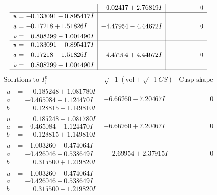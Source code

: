 \documentclass[1p]{elsarticle_modified}
\theoremstyle{definition}
\newcommand{\I}{\sqrt{-1}}
\begin{document}
$$\begin{array}{c|c|c}
 & \phantom{-}0.02417 + 2.76819 I & \phantom{-0.000000 } 0 \\ \hline\begin{aligned}
u &= -0.133091 + 0.895417 I \\
a &= -0.17218 + 1.51826 I \\
b &= \phantom{-}0.808299 - 1.004490 I\end{aligned}
 & -4.47954 - 4.44672 I & \phantom{-0.000000 } 0 \\ \hline\begin{aligned}
u &= -0.133091 - 0.895417 I \\
a &= -0.17218 - 1.51826 I \\
b &= \phantom{-}0.808299 + 1.004490 I\end{aligned}
 & -4.47954 + 4.44672 I & \phantom{-0.000000 } 0\\
 \hline 
 \end{array}$$\newpage$$\begin{array}{c|c|c}  
\text{Solutions to }I^u_{1}& \I (\text{vol} + \sqrt{-1}CS) & \text{Cusp shape}\\
 \hline 
\begin{aligned}
u &= \phantom{-}0.185248 + 1.081780 I \\
a &= -0.465084 + 1.124470 I \\
b &= \phantom{-}0.128815 - 1.149810 I\end{aligned}
 & -6.66260 - 7.20467 I & \phantom{-0.000000 } 0 \\ \hline\begin{aligned}
u &= \phantom{-}0.185248 - 1.081780 I \\
a &= -0.465084 - 1.124470 I \\
b &= \phantom{-}0.128815 + 1.149810 I\end{aligned}
 & -6.66260 + 7.20467 I & \phantom{-0.000000 } 0 \\ \hline\begin{aligned}
u &= -1.003260 + 0.474064 I \\
a &= -0.426046 + 0.538649 I \\
b &= \phantom{-}0.315500 + 1.219820 I\end{aligned}
 & \phantom{-}2.69954 + 2.37915 I & \phantom{-0.000000 } 0 \\ \hline\begin{aligned}
u &= -1.003260 - 0.474064 I \\
a &= -0.426046 - 0.538649 I \\
b &= \phantom{-}0.315500 - 1.219820 I\end{aligned}

\end{array}$$
\end{document}
